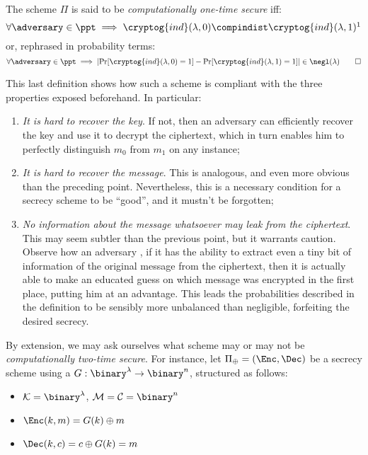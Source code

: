 \begin{definition}
    The scheme $\Pi$ is said to be \emph{computationally one-time secure} iff:
    \[
        \forall \adversary \in \ppt \implies \cryptog{ind}(\lambda, 0) \compindist \cryptog{ind}(\lambda, 1)\footnotemark
    \]  
    or, rephrased in probability terms:
    \[
        \forall \adversary \in \ppt \implies \lvert\Pr[\cryptog{ind}(\lambda, 0) = 1] - \Pr[\cryptog{ind}(\lambda, 1) = 1]\rvert \in \negl(\lambda) \qedhere
    \]
\end{definition}

This last definition shows how such a scheme is compliant with the three properties exposed beforehand. In particular:

\begin{enumerate}
    \item \emph{It is hard to recover the key}. If not, then an adversary \adversary{} can efficiently recover the key and use it to decrypt the ciphertext, which in turn enables him to perfectly distinguish $m_{0}$ from $m_{1}$ on any instance;
    \item \emph{It is hard to recover the message}. This is analogous, and even more obvious than the preceding point. Nevertheless, this is a necessary condition for a secrecy scheme to be ``good'', and it mustn't be forgotten;
    \item \emph{No information about the message whatsoever may leak from the ciphertext}. This may seem subtler than the previous point, but it warrants caution. Observe how an adversary \adversary{}, if it has the ability to extract even a tiny bit of information of the original message from the ciphertext, then it is actually able to make an educated guess on which message was encrypted in the first place, putting him at an advantage. This leads the probabilities described in the definition to be sensibly more unbalanced than negligible, forfeiting the desired secrecy.
\end{enumerate}

By extension, we may ask ourselves what scheme may or may not be \emph{computationally two-time secure}. For instance, let $\Pi_{\xor} = (\Enc, \Dec)$ be a secrecy scheme using a \prg{} $G : \binary^\lambda \to \binary^n$, structured as follows:

\begin{itemize}
    \item $\K = \binary^\lambda$, $\M = \C= \binary^n$
    \item $\Enc(k, m) = G(k) \xor m$
    \item $\Dec(k, c) = c \xor G(k) = m$
\end{itemize}

